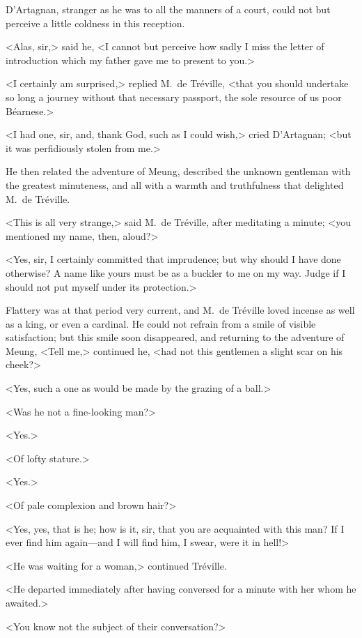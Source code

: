 D'Artagnan, stranger as he was to all the manners of a court, could not but perceive a little coldness in this reception. 

<Alas, sir,> said he, <I cannot but perceive how sadly I miss the letter of introduction which my father gave me to present to you.> 

<I certainly am surprised,> replied M.~de Tréville, <that you should undertake so long a journey without that necessary passport, the sole resource of us poor Béarnese.> 

<I had one, sir, and, thank God, such as I could wish,> cried D'Artagnan; <but it was perfidiously stolen from me.> 

He then related the adventure of Meung, described the unknown gentleman with the greatest minuteness, and all with a warmth and truthfulness that delighted M.~de Tréville. 

<This is all very strange,> said M.~de Tréville, after meditating a minute; <you mentioned my name, then, aloud?> 

<Yes, sir, I certainly committed that imprudence; but why should I have done otherwise? A name like yours must be as a buckler to me on my way. Judge if I should not put myself under its protection.> 

Flattery was at that period very current, and M.~de Tréville loved incense as well as a king, or even a cardinal. He could not refrain from a smile of visible satisfaction; but this smile soon disappeared, and returning to the adventure of Meung, <Tell me,> continued he, <had not this gentlemen a slight scar on his cheek?> 

<Yes, such a one as would be made by the grazing of a ball.> 

<Was he not a fine-looking man?> 

<Yes.> 

<Of lofty stature.> 

<Yes.> 

<Of pale complexion and brown hair?> 

<Yes, yes, that is he; how is it, sir, that you are acquainted with this man? If I ever find him again—and I will find him, I swear, were it in hell!> 

<He was waiting for a woman,> continued Tréville. 

<He departed immediately after having conversed for a minute with her whom he awaited.> 

<You know not the subject of their conversation?> 

